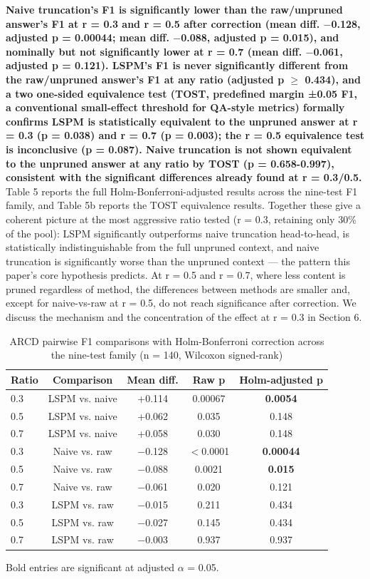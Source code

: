 \textbf{Naive truncation's F1 is significantly lower than the raw/unpruned answer's F1 at r = 0.3 and r = 0.5 after correction (mean diff. $-$0.128, adjusted p = 0.00044; mean diff. $-$0.088, adjusted p = 0.015), and nominally but not significantly lower at r = 0.7 (mean diff. $-$0.061, adjusted p = 0.121). LSPM's F1 is never significantly different from the raw/unpruned answer's F1 at any ratio (adjusted p $\geq$ 0.434), and a two one-sided equivalence test (TOST, predefined margin ±0.05 F1, a conventional small-effect threshold for QA-style metrics) formally confirms LSPM is statistically equivalent to the unpruned answer at r = 0.3 (p = 0.038) and r = 0.7 (p = 0.003); the r = 0.5 equivalence test is inconclusive (p = 0.087). Naive truncation is not shown equivalent to the unpruned answer at any ratio by TOST (p = 0.658-0.997), consistent with the significant differences already found at r = 0.3/0.5.} Table 5 reports the full Holm-Bonferroni-adjusted results across the nine-test F1 family, and Table 5b reports the TOST equivalence results. Together these give a coherent picture at the most aggressive ratio tested (r = 0.3, retaining only 30\% of the pool): LSPM significantly outperforms naive truncation head-to-head, is statistically indistinguishable from the full unpruned context, and naive truncation is significantly worse than the unpruned context --- the pattern this paper's core hypothesis predicts. At r = 0.5 and r = 0.7, where less content is pruned regardless of method, the differences between methods are smaller and, except for naive-vs-raw at r = 0.5, do not reach significance after correction. We discuss the mechanism and the concentration of the effect at r = 0.3 in Section 6.

\begin{table}[htbp]
\caption{ARCD pairwise F1 comparisons with Holm-Bonferroni correction across the nine-test family (n = 140, Wilcoxon signed-rank)}
\label{tab:5}
\centering
\footnotesize
\setlength{\tabcolsep}{3.5pt}
\begin{tabular}{lcccc}
\toprule
Ratio & Comparison & Mean diff. & Raw p & Holm-adjusted p \\
\midrule
0.3 & LSPM vs. naive & +0.114 & 0.00067 & \textbf{0.0054} \\
0.5 & LSPM vs. naive & +0.062 & 0.035 & 0.148 \\
0.7 & LSPM vs. naive & +0.058 & 0.030 & 0.148 \\
0.3 & Naive vs. raw & $-$0.128 & $<$0.0001 & \textbf{0.00044} \\
0.5 & Naive vs. raw & $-$0.088 & 0.0021 & \textbf{0.015} \\
0.7 & Naive vs. raw & $-$0.061 & 0.020 & 0.121 \\
0.3 & LSPM vs. raw & $-$0.015 & 0.211 & 0.434 \\
0.5 & LSPM vs. raw & $-$0.027 & 0.145 & 0.434 \\
0.7 & LSPM vs. raw & $-$0.003 & 0.937 & 0.937 \\
\bottomrule
\end{tabular}
\end{table}
Bold entries are significant at adjusted $\alpha$ = 0.05.

